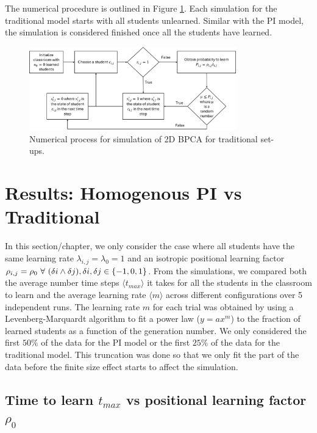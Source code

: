 The numerical procedure is outlined in Figure \ref{fig:2DBPCA Traditional Flowchart}. Each simulation for the traditional model starts with all students unlearned. Similar with the PI model, the simulation is considered finished once all the students have learned.

\begin{figure}[h!]
    \centering
    \includegraphics[width=0.8\textwidth]{figures/2DBPCA TI Flowchart.png}
    \caption[Traditional instruction flowchart]{Numerical process for simulation of 2D BPCA for traditional set-ups.}
    \label{fig:2DBPCA Traditional Flowchart}
\end{figure}

\section{Results: Homogenous PI vs Traditional}
In this section/chapter, we only consider the case where all students have the same learning rate $\lambda_{i,j} = \lambda_0 = 1$ and an isotropic positional learning factor $\rho_{i,j} = \rho_0 \space ~\forall~ (\delta i \land \delta j),  \delta i, \delta j \in \lbrace -1,0,1 \rbrace $. From the simulations, we compared both the average number time steps $\langle t_{max} \rangle$ it takes for all the students in the classroom to learn and the average learning rate $\langle m \rangle$ across different configurations over 5 independent runs. The learning rate $m$ for each trial was obtained by using a Levenberg-Marquardt algorithm to fit a power law ($y = ax^m$) to the fraction of learned students as a function of the generation number. We only considered the first $50\%$ of the data for the PI model or the first $25\%$ of the data for the traditional model. This truncation was done so that we only fit the part of the data before the finite size effect starts to affect the simulation.

\subsection{Time to learn $t_{max}$ vs positional learning factor $\rho_0$} \label{subsec: 2DBPCA tmax vs rho}

